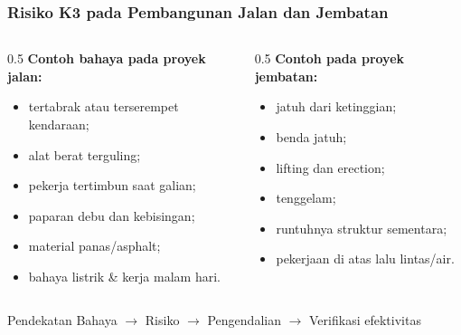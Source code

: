 \documentclass[../main.tex]{subfiles}
\begin{document}
\begin{frame}[mytitle=center,t,mycolor=white]
	\frametitle{Risiko K3 pada Pembangunan Jalan dan Jembatan}

	\begin{columns}[t]
		\begin{column}{0.5\textwidth}
			\textbf{Contoh bahaya pada proyek jalan:}
			\begin{itemize}
				\item tertabrak atau terserempet kendaraan;
				\item alat berat terguling;
				\item pekerja tertimbun saat galian;
				\item paparan debu dan kebisingan;
				\item material panas/asphalt;
				\item bahaya listrik \& kerja malam hari.
			\end{itemize}
		\end{column}

		\begin{column}{0.5\textwidth}
			\textbf{Contoh pada proyek jembatan:}
			\begin{itemize}
				\item jatuh dari ketinggian;
				\item benda jatuh;
				\item lifting dan erection;
				\item tenggelam;
				\item runtuhnya struktur sementara;
				\item pekerjaan di atas lalu lintas/air.
			\end{itemize}
		\end{column}
	\end{columns}

	\vspace{0.5cm}
	\begin{exampleblock}{Pendekatan}
		Bahaya $\rightarrow$ Risiko $\rightarrow$ Pengendalian $\rightarrow$ Verifikasi efektivitas
	\end{exampleblock}
\end{frame}
\end{document}
